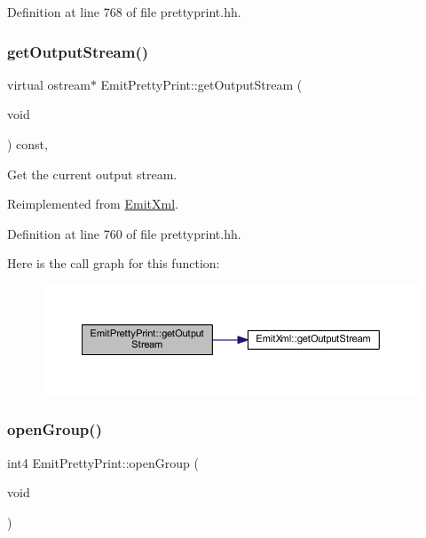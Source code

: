 Definition at line 768 of file prettyprint.\+hh.

\mbox{\label{class_emit_pretty_print_a599c4cdff19adb310a2a6a4109c4712a}} 
\subsubsection{\texorpdfstring{getOutputStream()}{getOutputStream()}}
{\footnotesize\ttfamily virtual ostream$\ast$ Emit\+Pretty\+Print\+::get\+Output\+Stream (\begin{DoxyParamCaption}\item[{void}]{ }\end{DoxyParamCaption}) const\hspace{0.3cm}{\ttfamily [inline]}, {\ttfamily [virtual]}}



Get the current output stream. 



Reimplemented from \mbox{\hyperlink{class_emit_xml_a1190216f59dd61157699a2ee4f2f4b29}{Emit\+Xml}}.



Definition at line 760 of file prettyprint.\+hh.

Here is the call graph for this function\+:
\nopagebreak
\begin{figure}[H]
\begin{center}
\leavevmode
\includegraphics[width=350pt]{class_emit_pretty_print_a599c4cdff19adb310a2a6a4109c4712a_cgraph}
\end{center}
\end{figure}
\mbox{\label{class_emit_pretty_print_aebc625908acafdfead7424ea48d53ce1}} 
\subsubsection{\texorpdfstring{openGroup()}{openGroup()}}
{\footnotesize\ttfamily int4 Emit\+Pretty\+Print\+::open\+Group (\begin{DoxyParamCaption}\item[{void}]{ }\end{DoxyParamCaption})\hspace{0.3cm}{\ttfamily [virtual]}}



